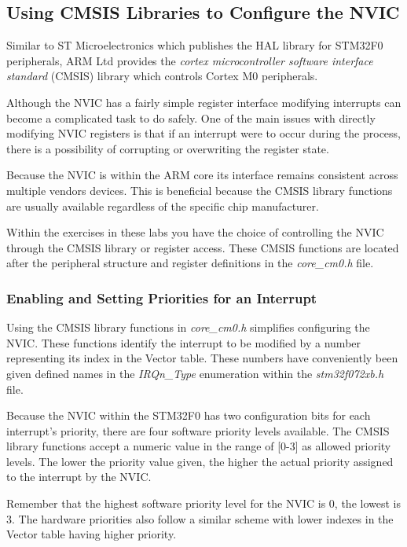 \documentclass[11pt,fleqn]{book} %
\begin{document}
 
\subsection{Using CMSIS Libraries to Configure the NVIC}
Similar to ST Microelectronics which publishes the HAL library for STM32F0 peripherals, ARM Ltd provides the \textit{cortex microcontroller software interface standard} (CMSIS) library which controls Cortex M0 peripherals. 

Although the NVIC has a fairly simple register interface modifying interrupts can become a complicated task to do safely. One of the main issues with directly modifying NVIC registers is that if an interrupt were to occur during the process, there is a possibility of corrupting or overwriting the register state.  

Because the NVIC is within the ARM core its interface remains consistent across multiple vendors devices. This is beneficial because the CMSIS library functions are usually available regardless of the specific chip manufacturer. 

Within the exercises in these labs you have the choice of controlling the NVIC through the CMSIS library or register access. These CMSIS functions are located after the peripheral structure and register definitions in the \textit{core\_cm0.h} file. 

\subsubsection{Enabling and Setting Priorities for an Interrupt}

Using the CMSIS library functions in \textit{core\_cm0.h} simplifies configuring the NVIC. These functions identify the interrupt to be modified by a number representing its index in the Vector table. These numbers have conveniently been given defined names in the \textit{IRQn\_Type} enumeration within the \textit{stm32f072xb.h} file.  

Because the NVIC within the STM32F0 has two configuration bits for each interrupt's priority, there are four software priority levels available. The CMSIS library functions accept a numeric value in the range of [0-3] as allowed priority levels. The lower the priority value given, the higher the actual priority assigned to the interrupt by the NVIC. 

\begin{warning}
    Remember that the highest software priority level for the NVIC is 0, the lowest is 3. The hardware priorities also follow a similar scheme with lower indexes in the Vector table having higher priority. 
\end{warning}
\end{document}
